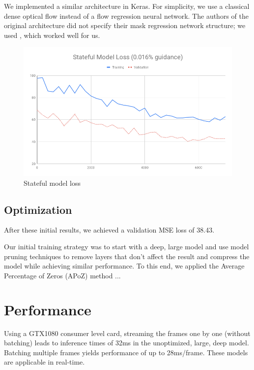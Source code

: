 \documentclass[12pt,openright,twoside,a4paper,english]{abntex2}
\begin{document}
\begin{otherlanguage}{english}
We implemented a similar architecture in Keras. For simplicity, we use a classical dense optical flow instead of a flow regression neural network. The authors of the original architecture did not specify their mask regression network structure; we used , %
which worked well for us.


\begin{figure}[!htb]
\centering
\includegraphics[width=\textwidth]{loss/Stateful}
\caption{Stateful model loss}
\label{loss_stateful}
\end{figure}

\subsection{Optimization}
After these initial results, we achieved a validation MSE loss of 38.43.

Our initial training strategy was to start with a deep, large model and use model pruning techniques to remove layers that don't affect the result and compress the model while achieving similar performance. To this end, we applied the Average Percentage of Zeros (APoZ) method ...

\section{Performance}
Using a GTX1080 consumer level card, streaming the frames one by one (without batching) leads to inference times of 32ms in the unoptimized, large, deep model. Batching multiple frames yields performance of up to 28ms/frame. These models are applicable in real-time.



\end{otherlanguage}
\end{document}

